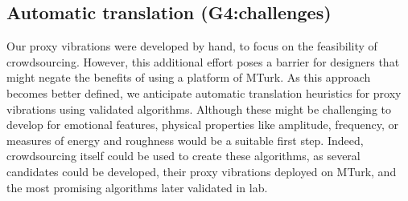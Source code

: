 \subsection{Automatic translation (G4:challenges)}
Our proxy vibrations were developed by hand, to focus on the feasibility of crowdsourcing.
However, this additional effort poses a barrier for designers that might negate the benefits of using a platform of MTurk.
As this approach becomes better defined, we anticipate automatic translation heuristics for proxy vibrations using validated algorithms.
Although these might be challenging to develop for %
emotional features, physical properties like amplitude, frequency, or measures of energy and roughness would be a suitable first step.
Indeed, crowdsourcing itself could be used to create these algorithms, as several candidates could be developed, their proxy vibrations deployed on MTurk, and the most promising algorithms later validated in lab.



        
       
        
        
        

        
        
        
